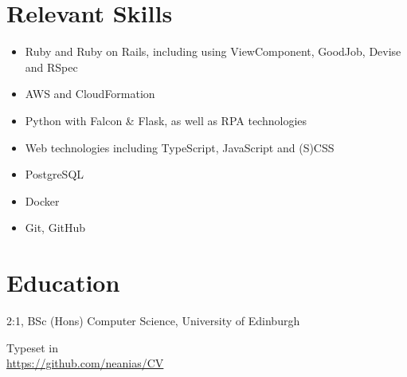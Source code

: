 \documentclass[10pt, a4paper]{article}
\newcommand{\years}[1]{\marginnote{\scriptsize #1}}
\begin{document}
\section*{Relevant Skills}

\begin{itemize}[noitemsep]
  \item Ruby and Ruby on Rails, including using ViewComponent,
    GoodJob, Devise and RSpec
  \item AWS and CloudFormation
  \item Python with Falcon \& Flask, as well as RPA technologies
  \item Web technologies including TypeScript, JavaScript and (S)CSS
  \item PostgreSQL
  \item Docker
  \item Git, GitHub
\end{itemize}

\section*{Education}
\years{2014--2018} 2:1, BSc (Hons) Computer Science, University of Edinburgh\\

\vfill{}

\begin{center}
  {\scriptsize %
    Typeset in \href{http://nitens.org/taraborelli/cvtex}{%
    \XeTeX}\\
  \url{https://github.com/neanias/CV}}
\end{center}
\end{document}
